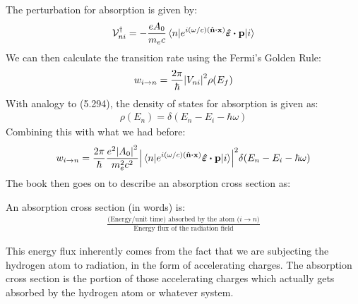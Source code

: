 \documentclass[12pt]{article}
\begin{document}
The perturbation for absorption is given by:
\begin{align*}
  \mcV^\dag_{ni}=-\frac{eA_0}{m_e c}\mel{n}
  {e^{i(\omega/c)(\vu{n}\vdot\vb{x})}\bm{\hat{\veps}}\vdot\vb{p}}{i}
\end{align*}
We can then calculate the transition rate using the Fermi's Golden Rule:
\begin{align*}
  w_{i\to n}=\frac{2\pi}{\hbar}\abs{V_{ni}}^2\rho(E_f)
\end{align*}
With analogy to (5.294), the density of states for absorption is given as:
\begin{align*}
  \rho(E_n)=\delta(E_n-E_i-\hbar\omega)
\end{align*}
Combining this with what we had before:
\begin{align*}
  w_{i\to n}=\frac{2\pi}{\hbar}\frac{e^2\abs{A_0}^2}{m_e^2c^2}
  \abs{
    \mel{n}{e^{i(\omega/c)(\vu{n}\vdot\vb{x})}\bm{\hat{\veps}}\vdot\vb{p}}{i}}^2
  \delta(E_n-E_i-\hbar\omega)
\end{align*}
The book then goes on to describe an absorption cross section as:
\begin{thebook}
  An absorption cross section (in words) is:
  \begin{align*}
    \frac{\text{(Energy/unit time) absorbed by the atom ($i\to n$)}}
    {\text{Energy flux of the radiation field}}
  \end{align*}
\end{thebook}
This energy flux inherently comes from the fact that we are subjecting the hydrogen atom to radiation, in the form of accelerating charges. The absorption cross section is the portion of those accelerating charges which actually gets absorbed by the hydrogen atom or whatever system.
\end{document}
